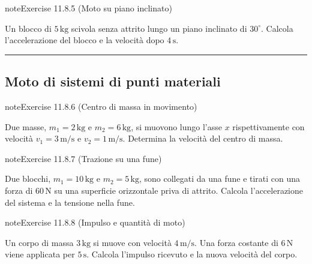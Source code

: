 \documentclass[letterpaper,10pt,italian]{jupyterBook}
\begin{document}
\begin{sphinxadmonition}{note}{Exercise 11.8.5 (Moto su piano inclinato)}



\sphinxAtStartPar
Un blocco di \(5 \, \text{kg}\) scivola senza attrito lungo un piano inclinato di \(30^\circ\). Calcola l’accelerazione del blocco e la velocità dopo \(4 \, \text{s}\).
\end{sphinxadmonition}


\bigskip\hrule\bigskip



\subsection{Moto di sistemi di punti materiali}
\label{\detokenize{ch/mechanics/dynamics-problems:moto-di-sistemi-di-punti-materiali}} \label{exercise:ch/mechanics/dynamics-problems-exercise-5}

\begin{sphinxadmonition}{note}{Exercise 11.8.6 (Centro di massa in movimento)}



\sphinxAtStartPar
Due masse, \(m_1 = 2 \, \text{kg}\) e \(m_2 = 6 \, \text{kg}\), si muovono lungo l’asse \(x\) rispettivamente con velocità \(v_1 = 3 \, \text{m/s}\) e \(v_2 = 1 \, \text{m/s}\). Determina la velocità del centro di massa.
\end{sphinxadmonition}
 \label{exercise:ch/mechanics/dynamics-problems-exercise-6}

\begin{sphinxadmonition}{note}{Exercise 11.8.7 (Trazione su una fune)}



\sphinxAtStartPar
Due blocchi, \(m_1 = 10 \, \text{kg}\) e \(m_2 = 5 \, \text{kg}\), sono collegati da una fune e tirati con una forza di \(60 \, \text{N}\) su una superficie orizzontale priva di attrito. Calcola l’accelerazione del sistema e la tensione nella fune.
\end{sphinxadmonition}
 \label{exercise:ch/mechanics/dynamics-problems-exercise-7}

\begin{sphinxadmonition}{note}{Exercise 11.8.8 (Impulso e quantità di moto)}



\sphinxAtStartPar
Un corpo di massa \(3 \, \text{kg}\) si muove con velocità \(4 \, \text{m/s}\). Una forza costante di \(6 \, \text{N}\) viene applicata per \(5 \, \text{s}\). Calcola l’impulso ricevuto e la nuova velocità del corpo.
\end{sphinxadmonition}
 \label{exercise:ch/mechanics/dynamics-problems-exercise-8}
\end{document}
